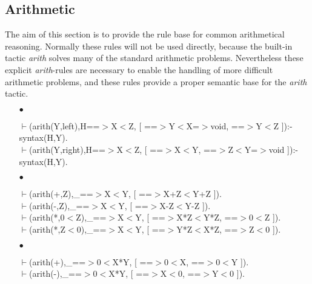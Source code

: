 \documentclass[11pt]{report}
\begin{document}
 \subsection{Arithmetic}
 The aim of this section is to provide the rule base
 for common arithmetical reasoning. Normally these rules
 will not be used directly, because the built-in tactic
 \emph{arith} solves many of the standard arithmetic problems.
 Nevertheless these explicit \emph{arith}-rules are necessary
 to enable the handling of more difficult arithmetic problems,
 and these rules provide a proper semantic base for the 
 \emph{arith} tactic. 
 \begin{enumerate}
 \item[$\bullet$]
\begin{sf}\begin{tabbing}
$\vdash$(arith(Y,left),H==$>$X$<$Z, [ ==$>$Y$<$X=$>$void, ==$>$Y$<$Z ]):-\\[-0.15ex]
\hspace{2em}syntax(H,Y).\\[-0.15ex]
$\vdash$(arith(Y,right),H==$>$X$<$Z, [ ==$>$X$<$Y, ==$>$Z$<$Y=$>$void ]):-\\[-0.15ex]
\hspace{2em}syntax(H,Y).
\end{tabbing}\end{sf}

  
 \item[$\bullet$]
\begin{sf}\begin{tabbing}
$\vdash$(arith(+,Z),\_\hspace{0.1em}==$>$X$<$Y, [ ==$>$X+Z$<$Y+Z ]).\\[-0.15ex]
$\vdash$(arith(-,Z),\_\hspace{0.1em}==$>$X$<$Y, [ ==$>$X-Z$<$Y-Z ]).\\[-0.15ex]
$\vdash$(arith(*,0$<$Z),\_\hspace{0.1em}==$>$X$<$Y, [ ==$>$X*Z$<$Y*Z, ==$>$0$<$Z ]).\\[-0.15ex]
$\vdash$(arith(*,Z$<$0),\_\hspace{0.1em}==$>$X$<$Y, [ ==$>$Y*Z$<$X*Z, ==$>$Z$<$0 ]).
\end{tabbing}\end{sf}

  
 \item[$\bullet$]
\begin{sf}\begin{tabbing}
$\vdash$(arith(+),\_\hspace{0.1em}==$>$0$<$X*Y, [ ==$>$0$<$X, ==$>$0$<$Y ]).\\[-0.15ex]
$\vdash$(arith(-),\_\hspace{0.1em}==$>$0$<$X*Y, [ ==$>$X$<$0, ==$>$Y$<$0 ]).
\end{tabbing}\end{sf}


\end{enumerate}
\end{document}
